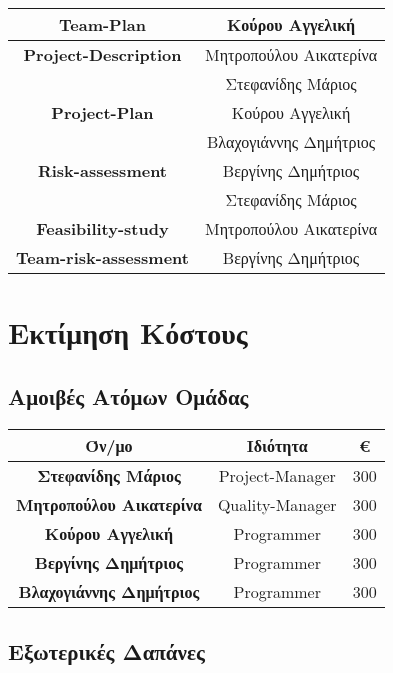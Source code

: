 \documentclass{article}
\begin{document}
\begin{center}
     \begin{tabular}{|c|c|}
     \hline
      \textbf{Team-Plan}   & Κούρου Αγγελική \\
      \hline
      \textbf{Project-Description} & Μητροπούλου Αικατερίνα \\ & Στεφανίδης Μάριος\\
      \hline
      \textbf{Project-Plan} & Κούρου Αγγελική \\ & Βλαχογιάννης Δημήτριος\\
      \hline
      \textbf{Risk-assessment} & Βεργίνης Δημήτριος \\ & Στεφανίδης Μάριος\\
      \hline
      \textbf{Feasibility-study} & Μητροπούλου Αικατερίνα \\
      \hline
      \textbf{Team-risk-assessment} & Βεργίνης Δημήτριος\\
      \hline
     \end{tabular}
 \end{center}
\newpage 

\section{Εκτίμηση Κόστους}

\subsection{Αμοιβές Ατόμων Ομάδας}

\begin{center}
     \begin{tabular}{|c|c|c|}
     \hline
      \textbf{Όν/μο}   & \textbf{Ιδιότητα} & \textbf{€}\\
      \hline\hline
      \textbf {Στεφανίδης Μάριος} & Project-Manager & 300\\
      \hline
      \textbf {Μητροπούλου Αικατερίνα} & Quality-Manager & 300\\
      \hline
      \textbf {Κούρου Αγγελική} & Programmer & 300\\
      \hline
      \textbf {Βεργίνης Δημήτριος} & Programmer & 300\\
      \hline
      \textbf {Βλαχογιάννης Δημήτριος} & Programmer & 300\\
      \hline
     \end{tabular}
 \end{center}

\subsection{Εξωτερικές Δαπάνες}
\end{document}
